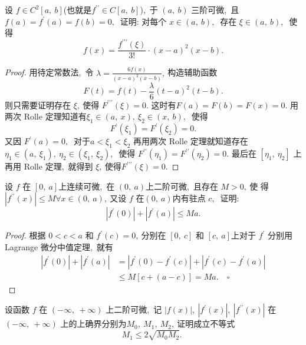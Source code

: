\newpage
\begin{problem}
	设 $ f \in C^{2}[a,\  b]  $(也就是$  f^{\prime \prime} \in C[a,\  b]  $),\  于  $(a,\  b)$  三阶可微,\  且 $ f(a)=   f^{\prime}(a)=f(b)=0 ,\ $ 证明: 对每个  $x \in(a,\  b) ,\ $ 存在 $ \xi \in(a,\  b) ,\ $ 使得
	$$f(x)=\frac{f^{\prime \prime \prime}(\xi)}{3 !} \cdot(x-a)^{2}(x-b) .$$
\end{problem}
\begin{proof}
	用待定常数法,\  令 $ \lambda=\frac{6 f(x)}{(x-a)^{2}(x-b)} ,\  $构造辅助函数
	$$F(t)=f(t)-\frac{\lambda}{6}(t-a)^{2}(t-b) .$$
	则只需要证明存在 $ \xi ,\  $使得  $F^{\prime \prime \prime}(\xi)=0 .$
	这时有$  F(a)=F(b)=F(x)=0 .$ 用两次 Rolle 定理知道有$  \xi_{1} \in(a,\  x),\  \xi_{2} \in   (x,\  b) ,\ $ 使得
	$$F^{\prime}\left(\xi_{1}\right)=F^{\prime}\left(\xi_{2}\right)=0 .$$
	又因 $ F^{\prime}(a)=0 ,\ $ 对于$  a<\xi_{1}<\xi_{2} $ 再用两次 Rolle 定理就知道存在$  \eta_{1} \in\left(a,\  \xi_{1}\right) ,\   \eta_{2} \in\left(\xi_{1},\  \xi_{2}\right) ,\ $ 使得  $F^{\prime \prime}\left(\eta_{1}\right)=F^{\prime \prime}\left(\eta_{2}\right)=0 .$ 最后在  $\left[\eta_{1},\  \eta_{2}\right] $ 上再用 Rolle 定理,\  就得到  $\xi ,\  $使得$  F^{\prime \prime \prime}(\xi)=0 .$
\end{proof}
\newpage
\begin{problem}
	设 $ f $ 在 $ [0,\  a]  $上连续可微,\  在 $ (0,\  a)  $上二阶可微,\  且存在 $ M>0 ,\  $使 得 $ \left|f^{\prime \prime}(x)\right| \leqslant M \forall x \in(0,\  a) ,\  $又设  $f $ 在$  (0,\  a)  $内有驻点 $ c ,\ $ 证明:
	$$\left|f^{\prime}(0)\right|+\left|f^{\prime}(a)\right| \leqslant M a .$$
\end{problem}
\begin{proof}
	根据 $0<c<a $ 和 $ f^{\prime}(c)=0 ,\  $分别在 $ [0,\  c] $ 和 $ [c,\  a]  $上对于  $f^{\prime} $ 分别用 Lagrange 微分中值定理,\  就有
	$$\begin{aligned}
		\left|f^{\prime}(0)\right|+\left|f^{\prime}(a)\right| & =\left|f^{\prime}(0)-f^{\prime}(c)\right|+\left|f^{\prime}(c)-f^{\prime}(a)\right| \\
		& \leqslant M[c+(a-c)]=M a . \quad \square
	\end{aligned}$$
\end{proof}
\newpage
\begin{problem}
	设函数 $ f $ 在 $ (-\infty,\ +\infty) $ 上二阶可微,\  记  $|f(x)|,\ \left|f^{\prime}(x)\right|,\ \left|f^{\prime \prime}(x)\right|$  在 $ (-\infty,\ +\infty)$  上的上确界分别为$  M_{0},\  M_{1},\  M_{2} ,\  $证明成立不等式
	$$M_{1} \leqslant 2 \sqrt{M_{0} M_{2}} \text {. }$$
\end{problem}
